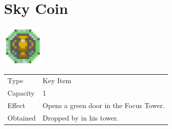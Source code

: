 \section{Sky Coin}
\label{item:sky_coin}

\includegraphics[height=2cm,keepaspectratio]{./resources/items/skycoin}

\begin{longtable}{ l p{9cm} }
	Type
	& Key Item
\\ %
	Capacity
	& 1
\\ %
	Effect
	& Opens a green door in the Focus Tower.
\\ %
	Obtained
	& Dropped by \nameref{monster:pazuzu} in his tower.
\end{longtable}

